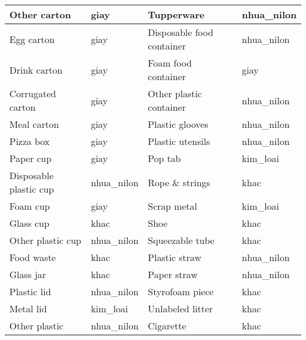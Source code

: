 \documentclass[../the.tex]{subfiles}
\begin{document}
\begin{table}[!h]
\begin{tabular}{|l|l|l|l|}
		Other carton           & giay                                  & Tupperware                & nhua\_nilon \\ \hline
		Egg carton             & giay                                  & Disposable food container & nhua\_nilon \\ \hline
		Drink carton           & giay                                  & Foam food container       & giay        \\ \hline
		Corrugated carton      & giay                                  & Other plastic container   & nhua\_nilon \\ \hline
		Meal carton            & giay                                  & Plastic glooves           & nhua\_nilon \\ \hline
		Pizza box              & giay                                  & Plastic utensils          & nhua\_nilon \\ \hline
		Paper cup              & giay                                  & Pop tab                   & kim\_loai   \\ \hline
		Disposable plastic cup & nhua\_nilon                           & Rope \& strings           & khac        \\ \hline
		Foam cup               & giay                                  & Scrap metal               & kim\_loai   \\ \hline
		Glass cup              & khac                                  & Shoe                      & khac        \\ \hline
		Other plastic cup      & nhua\_nilon                           & Squeezable tube           & khac        \\ \hline
		Food waste             & khac                                  & Plastic straw             & nhua\_nilon \\ \hline
		Glass jar              & khac                                  & Paper straw               & nhua\_nilon \\ \hline
		Plastic lid            & nhua\_nilon                           & Styrofoam piece           & khac        \\ \hline
		Metal lid              & kim\_loai                             & Unlabeled litter          & khac        \\ \hline
		Other plastic          & nhua\_nilon                           & Cigarette                 & khac        \\ \hline
	\end{tabular}
	\label{tab:taco_map}
\end{table}
\end{document}

